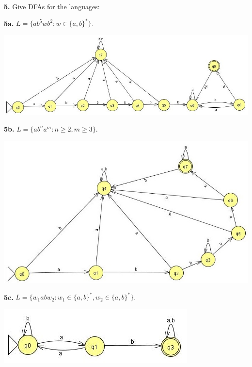 \documentclass[12pt,letter]{article}
\begin{document}
\pagebreak

\textbf{5.} Give DFAs for the languages:

\textbf{5a.} $L = \lbrace ab^5 wb^2 : w \in \lbrace a,b \rbrace^{*} \rbrace$.
\begin{center}
	\includegraphics[scale=0.75]{"images/Lab 1 - 5a"}
\end{center}

\textbf{5b.} $L = \lbrace ab^n a^m : n \geq 2, m \geq 3 \rbrace$.
\begin{center}
	\includegraphics[scale=0.75]{"images/Lab 1 - 5b"}
\end{center}

\textbf{5c.} $L = \lbrace w_1 ab w_2 : w_1 \in \lbrace a,b \rbrace^{*} , w_2 \in \lbrace a,b \rbrace^{*} \rbrace$.
\begin{center}
	\includegraphics{"images/Lab 1 - 5c"}
\end{center}

\pagebreak
\end{document}
